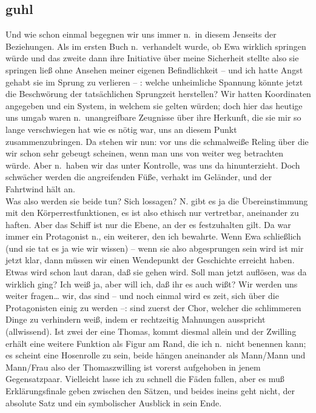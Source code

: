 \documentclass[
]{article}
\author{}
\date{\vspace{-2.5em}}
\begin{document}
\subsection{guhl}\label{guhl}

Und wie schon einmal begegnen wir uns immer n.~in diesem Jenseits der
Beziehungen. Als im ersten Buch n.~verhandelt wurde, ob Ewa wirklich
springen würde und das zweite dann ihre Initiative über meine Sicherheit
stellte also sie springen ließ ohne Ansehen meiner eigenen
Befindlichkeit -- und ich hatte Angst gehabt sie im Sprung zu verlieren
-- : welche unheimliche Spannung könnte jetzt die Beschwörung der
tatsächlichen Sprungzeit herstellen? Wir hatten Koordinaten angegeben
und ein System, in welchem sie gelten würden; doch hier das heutige uns
umgab waren n.~unangreifbare Zeugnisse über ihre Herkunft, die sie mir
so lange verschwiegen hat wie es nötig war, uns an diesem Punkt
zusammenzubringen. Da stehen wir nun: vor uns die schmalweiße Reling
über die wir schon sehr gebeugt scheinen, wenn man uns von weiter weg
betrachten würde. Aber n.~haben wir das unter Kontrolle, was uns da
hinunterzieht. Doch schwächer werden die angreifenden Füße, verhakt im
Geländer, und der Fahrtwind hält an.\\
Was also werden sie beide tun? Sich lossagen? N. gibt es ja die
Übereinstimmung mit den Körperrestfunktionen, es ist also ethisch nur
vertretbar, aneinander zu haften. Aber das Schiff ist nur die Ebene, an
der es festzuhalten gilt. Da war immer ein Protagonist n., ein weiterer,
den ich bewahrte. Wenn Ewa schließlich (und sie tat es ja wie wir
wissen) -- wenn sie also abgesprungen sein wird ist mir jetzt klar, dann
müssen wir einen Wendepunkt der Geschichte erreicht haben. Etwas wird
schon laut daran, daß sie gehen wird. Soll man jetzt auflösen, was da
wirklich ging? Ich weiß ja, aber will ich, daß ihr es auch wißt? Wir
werden uns weiter fragen\ldots{} wir, das sind -- und noch einmal wird
es zeit, sich über die Protagonisten einig zu werden --: sind zuerst der
Chor, welcher die schlimmeren Dinge zu verhindern weiß, indem er
rechtzeitig Mahnungen ausspricht (allwissend). Ist zwei der eine Thomas,
kommt diesmal allein und der Zwilling erhält eine weitere Funktion als
Figur am Rand, die ich n.~nicht benennen kann; es scheint eine
Hosenrolle zu sein, beide hängen aneinander als Mann/Mann und Mann/Frau
also der Thomaszwilling ist vorerst aufgehoben in jenem Gegensatzpaar.
Vielleicht lasse ich zu schnell die Fäden fallen, aber es muß
Erklärungsfinale geben zwischen den Sätzen, und beides ineins geht
nicht, der absolute Satz und ein symbolischer Ausblick in sein Ende.
\end{document}
